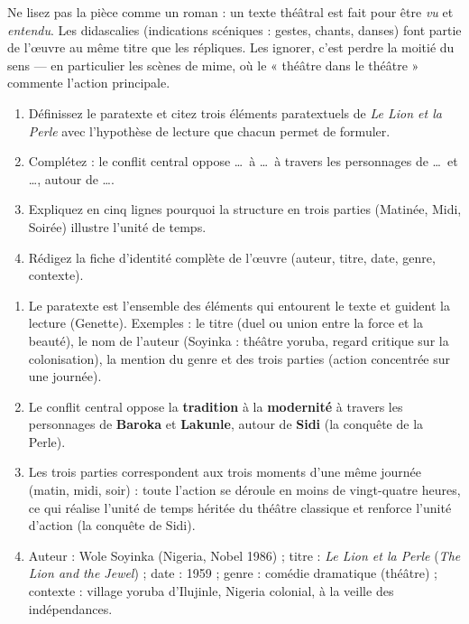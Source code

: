 \documentclass[11pt]{article}
\begin{document}
\begin{attention}
Ne lisez pas la pièce comme un roman : un texte théâtral est fait pour être \emph{vu} et \emph{entendu}. Les didascalies (indications scéniques : gestes, chants, danses) font partie de l'œuvre au même titre que les répliques. Les ignorer, c'est perdre la moitié du sens — en particulier les scènes de mime, où le « théâtre dans le théâtre » commente l'action principale.
\end{attention}

\begin{exercice}
\begin{enumerate}
\item Définissez le paratexte et citez trois éléments paratextuels de \emph{Le Lion et la Perle} avec l'hypothèse de lecture que chacun permet de formuler.
\item Complétez : le conflit central oppose \ldots\ à \ldots\ à travers les personnages de \ldots\ et \ldots, autour de \ldots.
\item Expliquez en cinq lignes pourquoi la structure en trois parties (Matinée, Midi, Soirée) illustre l'unité de temps.
\item Rédigez la fiche d'identité complète de l'œuvre (auteur, titre, date, genre, contexte).
\end{enumerate}
\end{exercice}

\begin{corrige}
\begin{enumerate}
\item Le paratexte est l'ensemble des éléments qui entourent le texte et guident la lecture (Genette). Exemples : le titre (duel ou union entre la force et la beauté), le nom de l'auteur (Soyinka : théâtre yoruba, regard critique sur la colonisation), la mention du genre et des trois parties (action concentrée sur une journée).
\item Le conflit central oppose la \textbf{tradition} à la \textbf{modernité} à travers les personnages de \textbf{Baroka} et \textbf{Lakunle}, autour de \textbf{Sidi} (la conquête de la Perle).
\item Les trois parties correspondent aux trois moments d'une même journée (matin, midi, soir) : toute l'action se déroule en moins de vingt-quatre heures, ce qui réalise l'unité de temps héritée du théâtre classique et renforce l'unité d'action (la conquête de Sidi).
\item Auteur : Wole Soyinka (Nigeria, Nobel 1986) ; titre : \emph{Le Lion et la Perle} (\emph{The Lion and the Jewel}) ; date : 1959 ; genre : comédie dramatique (théâtre) ; contexte : village yoruba d'Ilujinle, Nigeria colonial, à la veille des indépendances.
\end{enumerate}
\end{corrige}
\end{document}
